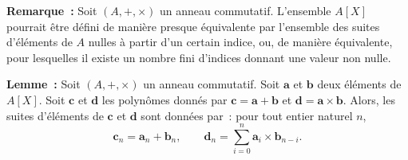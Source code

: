 \medskip

\noindent\textbf{Remarque :} 
    Soit $(A, +, \times)$ un anneau commutatif.
    L'ensemble $A[X]$ pourrait être défini de manière presque équivalente par l'ensemble des suites d'éléments de $A$ nulles à partir d'un certain indice, ou, de manière équivalente, pour lesquelles il existe un nombre fini d'indices donnant une valeur non nulle.

\medskip

\noindent\textbf{Lemme :}
    Soit $(A, +, \times)$ un anneau commutatif.
    Soit $\mathbf{a}$ et $\mathbf{b}$ deux éléments de $A[X]$. 
    Soit $\mathbf{c}$ et $\mathbf{d}$ les polynômes donnés par $\mathbf{c} = \mathbf{a} + \mathbf{b}$ et $\mathbf{d} = \mathbf{a} \times \mathbf{b}$.
    Alors, les suites d'éléments de $\mathbf{c}$ et $\mathbf{d}$ sont données par : pour tout entier naturel $n$, 
    \begin{equation*}
        \mathbf{c}_n = \mathbf{a}_n + \mathbf{b}_n, 
        \qquad
        \mathbf{d}_n = \sum_{i=0}^n \mathbf{a}_i \times \mathbf{b}_{n-i}
        .
    \end{equation*}

\medskip

